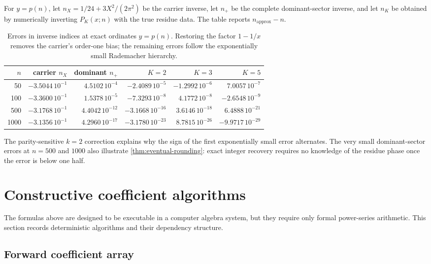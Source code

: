 \documentclass[11pt,a4paper]{article}
\numberwithin{equation}{section}
\theoremstyle{remark}
\begin{document}
For $y=p(n)$, let $n_X=1/24+3X^2/(2\pi^2)$ be the carrier inverse, let $n_+$ be the complete dominant-sector inverse, and let $n_K$ be obtained by numerically inverting $P_K(x;n)$ with the true residue data.  The table reports $n_{\mathrm{approx}}-n$.

\begin{table}[htbp]
\centering
\small
\begin{tabular}{r r r r r r}
\toprule
$n$ & carrier $n_X$ & dominant $n_+$ & $K=2$ & $K=3$ & $K=5$\\
\midrule
50   & $-3.5044\,10^{-1}$ & $ 4.5102\,10^{-4}$ & $-2.4089\,10^{-5}$ & $-1.2992\,10^{-6}$ & $ 7.0057\,10^{-7}$\\
100  & $-3.3600\,10^{-1}$ & $ 1.5378\,10^{-5}$ & $-7.3293\,10^{-8}$ & $ 4.1772\,10^{-8}$ & $-2.6548\,10^{-9}$\\
500  & $-3.1768\,10^{-1}$ & $ 4.4042\,10^{-12}$ & $-3.1668\,10^{-16}$ & $ 3.6146\,10^{-18}$ & $ 6.4888\,10^{-21}$\\
1000 & $-3.1356\,10^{-1}$ & $ 4.2960\,10^{-17}$ & $-3.1780\,10^{-23}$ & $ 8.7815\,10^{-26}$ & $-9.9717\,10^{-29}$\\
\bottomrule
\end{tabular}
\caption{Errors in inverse indices at exact ordinates $y=p(n)$.  Restoring the factor $1-1/x$ removes the carrier's order-one bias; the remaining errors follow the exponentially small Rademacher hierarchy.}
\label{tab:inverse-errors}
\end{table}

The parity-sensitive $k=2$ correction explains why the sign of the first exponentially small error alternates.  The very small dominant-sector errors at $n=500$ and $1000$ also illustrate \cref{thm:eventual-rounding}: exact integer recovery requires no knowledge of the residue phase once the error is below one half.

\section{Constructive coefficient algorithms}\label{sec:algorithms}

The formulas above are designed to be executable in a computer algebra system, but they require only formal power-series arithmetic.  This section records deterministic algorithms and their dependency structure.

\subsection{Forward coefficient array}
\end{document}
